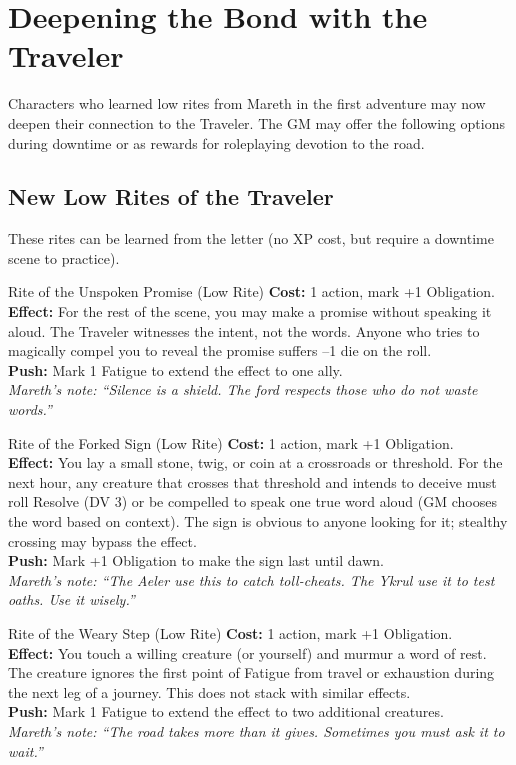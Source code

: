 \documentclass[10pt,twoside]{book}
\begin{document}
\section*{Deepening the Bond with the Traveler}

Characters who learned low rites from Mareth in the first adventure may now deepen their connection to the Traveler. The GM may offer the following options during downtime or as rewards for roleplaying devotion to the road.

\subsection*{New Low Rites of the Traveler}

These rites can be learned from the letter (no XP cost, but require a downtime scene to practice).

\begin{adventurebox}{Rite of the Unspoken Promise (Low Rite)}
\textbf{Cost:} 1 action, mark +1 Obligation. \\
\textbf{Effect:} For the rest of the scene, you may make a promise without speaking it aloud. The Traveler witnesses the intent, not the words. Anyone who tries to magically compel you to reveal the promise suffers --1 die on the roll. \\
\textbf{Push:} Mark 1 Fatigue to extend the effect to one ally. \\
\textit{Mareth's note: ``Silence is a shield. The ford respects those who do not waste words.''}
\end{adventurebox}

\begin{adventurebox}{Rite of the Forked Sign (Low Rite)}
\textbf{Cost:} 1 action, mark +1 Obligation. \\
\textbf{Effect:} You lay a small stone, twig, or coin at a crossroads or threshold. For the next hour, any creature that crosses that threshold and intends to deceive must roll Resolve (DV 3) or be compelled to speak one true word aloud (GM chooses the word based on context). The sign is obvious to anyone looking for it; stealthy crossing may bypass the effect. \\
\textbf{Push:} Mark +1 Obligation to make the sign last until dawn. \\
\textit{Mareth's note: ``The Aeler use this to catch toll-cheats. The Ykrul use it to test oaths. Use it wisely.''}
\end{adventurebox}

\begin{adventurebox}{Rite of the Weary Step (Low Rite)}
\textbf{Cost:} 1 action, mark +1 Obligation. \\
\textbf{Effect:} You touch a willing creature (or yourself) and murmur a word of rest. The creature ignores the first point of Fatigue from travel or exhaustion during the next leg of a journey. This does not stack with similar effects. \\
\textbf{Push:} Mark 1 Fatigue to extend the effect to two additional creatures. \\
\textit{Mareth's note: ``The road takes more than it gives. Sometimes you must ask it to wait.''}
\end{adventurebox}
\end{document}
